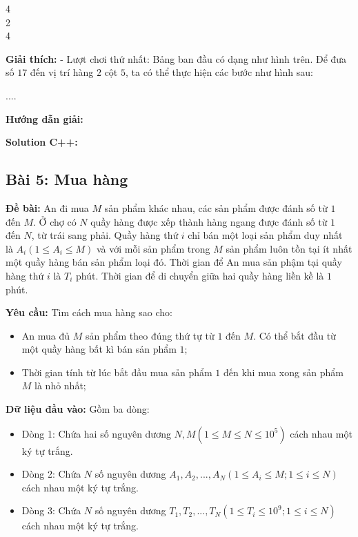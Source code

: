 \documentclass[12pt]{scrartcl}  %
\begin{document}
\begin{tcolorbox}[colback=gray!5!white, colframe=green!50!black, title=Output]
4\\
2\\
4
\end{tcolorbox}

\textbf{Giải thích:}
- Lượt chơi thứ nhất: Bảng ban đầu có dạng như hình trên. Để đưa số $17$ đến vị trí hàng $2$ cột $5$, ta có thể thực hiện các bước như hình sau:

....


\textbf{Hướng dẫn giải:}

\textbf{Solution C++:}

\subsection{Bài 5: Mua hàng}
\textbf{Đề bài:}
An đi mua $M$ sản phẩm khác nhau, các sản phẩm được đánh số từ $1$ đến $M$. Ở chợ có $N$ quầy hàng được xếp thành hàng ngang được đánh số từ $1$ đến $N$, từ trái sang phải. Quầy hàng thứ $i$ chỉ bán một loại sản phẩm duy nhất là $A_i (1 \leq A_i \leq M)$ và với mỗi sản phẩm trong $M$ sản phẩm luôn tồn tại ít nhất 
một quầy hàng bán sản phẩm loại đó. Thời gian để An mua sản phậm tại quầy hàng thứ $i$ là $T_i$ phút. Thời gian để di chuyển giữa hai quầy hàng liền kề là $1$ phút.

\textbf{Yêu cầu:}
Tìm cách mua hàng sao cho:
\begin{itemize}
    \item An mua đủ $M$ sản phẩm theo đúng thứ tự từ $1$ đến $M$. Có thể bắt đầu từ một quầy hàng bất kì bán sản phẩm $1$;
    \item Thời gian tính từ lúc bắt đầu mua sản phẩm $1$ đến khi mua xong sản phẩm $M$ là nhỏ nhất;
\end{itemize}

\textbf{Dữ liệu đầu vào:}
Gồm ba dòng:
\begin{itemize}
    \item Dòng 1: Chứa hai số nguyên dương $N, M (1 \leq M \leq N \leq 10^5)$ cách nhau một ký tự trắng.
    \item Dòng 2: Chứa $N$ số nguyên dương $A_1, A_2, ... , A_N (1 \leq A_i \leq M; 1 \leq i \leq N)$ cách nhau một ký tự trắng.
    \item Dòng 3: Chứa $N$ số nguyên dương $T_1, T_2, ... , T_N (1 \leq T_i \leq 10^9; 1 \leq i \leq N)$ cách nhau một ký tự trắng.
\end{itemize}
\end{document}
